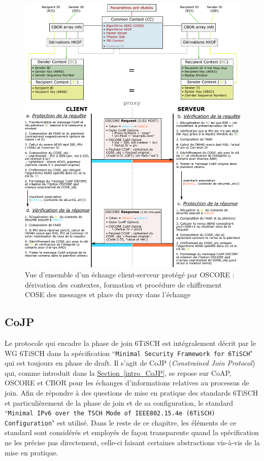 \documentclass[]{report}
\newcommand{\wordlink}[2]{\hyperref[#2]{#1~\ref{#2}}}
\begin{document}
	\begin{figure}[!hb]
	\centering
	\includegraphics[width=\linewidth]{OSCORE_exchange}
	\caption{Vue d'ensemble d'un échange client-serveur protégé par OSCORE : dérivation des contextes, formation et procédure de chiffrement COSE des messages et place du proxy dans l'échange}
	\label{fig:OSCORE_exchange}
	\end{figure}

\newpage

\subsection{CoJP}
\label{CoJP}

Le protocole qui encadre la phase de join 6TiSCH est intégralement décrit par le WG 6TiSCH dans la spécification ``\texttt{Minimal Security Framework for 6TiSCH}" \cite{ietf-6tisch-minimal-security-15} qui est toujours en phase de draft. Il s'agit de CoJP (\textit{Constrained Join Protocol}) qui, comme introduit dans la \wordlink{Section}{intro_CoJP}, se repose sur CoAP, OSCORE et CBOR pour les échanges d'informations relatives au processus de join. Afin de répondre à des questions de mise en pratique des standards 6TiSCH et particulièrement de la phase de join et de sa configuration, le standard ``\texttt{Minimal IPv6 over the TSCH Mode of IEEE802.15.4e (6TiSCH) Configuration}" \cite{rfc8180} est utilisé. Dans le reste de ce chapitre, les éléments de ce standard sont considérés et employés de façon transparente quand la spécification \cite{ietf-6tisch-minimal-security-15} ne les précise pas directement, celle-ci faisant certaines abstractions vis-à-vis de la mise en pratique.\\
\end{document}
